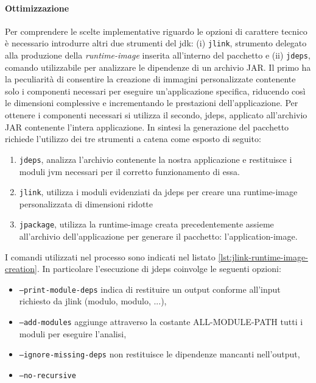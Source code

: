 \paragraph{Ottimizzazione} Per comprendere le scelte implementative riguardo le opzioni di carattere tecnico è necessario introdurre altri due strumenti del \ac{jdk}: (i) \texttt{jlink}, strumento delegato alla produzione della \textit{runtime-image} inserita all'interno del pacchetto e (ii) \texttt{jdeps}, comando utilizzabile per analizzare le dipendenze di un archivio JAR. Il primo ha la peculiarità di consentire la creazione di immagini personalizzate contenente solo i componenti necessari per eseguire un'applicazione specifica, riducendo così le dimensioni complessive e incrementando le prestazioni dell'applicazione. Per ottenere i componenti necessari si utilizza il secondo, jdeps, applicato all'archivio JAR contenente l'intera applicazione. In sintesi la generazione del pacchetto richiede l'utilizzo dei tre strumenti a catena come esposto di seguito:
\begin{enumerate}
	\item \texttt{jdeps}, analizza l'archivio contenente la nostra applicazione e restituisce i moduli jvm necessari per il corretto funzionamento di essa.
	\item \texttt{jlink}, utilizza i moduli evidenziati da jdeps per creare una runtime-image personalizzata di dimensioni ridotte
	\item \texttt{jpackage}, utilizza la runtime-image creata precedentemente assieme all'archivio dell'applicazione per generare il pacchetto: l'application-image.
\end{enumerate}



I comandi utilizzati nel processo sono indicati nel listato \ref{lst:jlink-runtime-image-creation}. In particolare l'esecuzione di jdeps coinvolge le seguenti opzioni:
\begin{itemize}
	\item \texttt{--print-module-deps} indica di restituire un output conforme all'input richiesto da jlink (modulo, modulo, ...),
	\item \texttt{--add-modules} aggiunge attraverso la costante ALL-MODULE-PATH tutti i moduli per eseguire l'analisi,
	\item \texttt{--ignore-missing-deps} non restituisce le dipendenze mancanti nell'output,
	\item \texttt{--no-recursive} 
\end{itemize}

